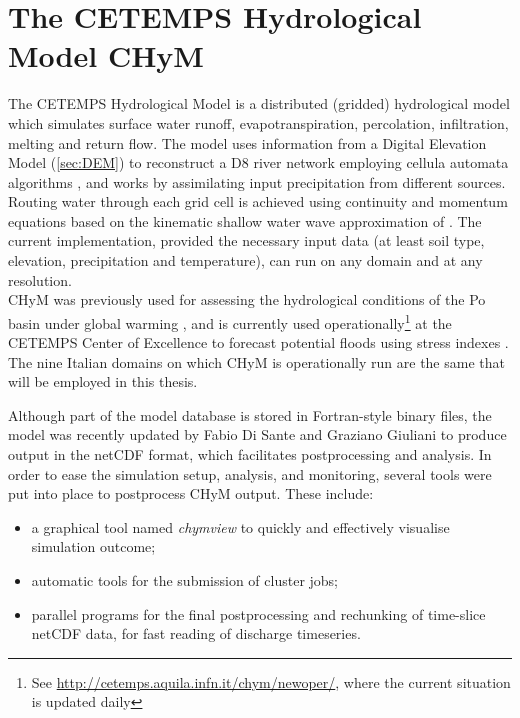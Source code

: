 
\section{The CETEMPS Hydrological Model CHyM} \label{sec:chym}
The CETEMPS Hydrological Model \citep[CHyM\footnote{\url{http://cetemps.aquila.infn.it/chym/}}, ][]{Tomassetti2005,Coppola2007} is a distributed (gridded) hydrological model which simulates surface water runoff,
evapotranspiration, percolation, infiltration, melting and return flow.
The model uses information from a Digital Elevation Model (\cref{sec:DEM}) to reconstruct a D8 river network employing cellula automata algorithms \citep{Coppola2006,Coppola2007}, and works by assimilating input precipitation from different sources.
Routing water through each grid cell is achieved using continuity
and momentum equations based on the kinematic shallow water wave approximation of \citet{Lighthill1955}.
The current implementation, provided the necessary input data (at least soil type, elevation, precipitation and temperature), can run on any domain and at any resolution.\\
CHyM was previously used for assessing the hydrological conditions of the Po basin under global warming \citep{coppola2014ChahydconPobasundglowar}, and
is currently used operationally\footnote{See \url{http://cetemps.aquila.infn.it/chym/newoper/}, where the current situation is updated daily} at the CETEMPS Center of Excellence to forecast potential floods using stress indexes \citep{Verdecchia2008,Tomassetti2005}.
The nine Italian domains on which CHyM is operationally run are the same that will be employed in this thesis.

Although part of the model database is stored in Fortran-style binary files, the model was recently updated by Fabio Di Sante and Graziano Giuliani to produce output in the netCDF format, which facilitates postprocessing and analysis.
In order to ease the simulation setup, analysis, and monitoring, several tools were put into place to postprocess CHyM output. These include:
\begin{itemize}
    \item a graphical tool named \emph{chymview} to quickly and effectively visualise simulation outcome;
    \item automatic tools for the submission of cluster jobs;
    \item parallel programs for the final postprocessing and rechunking of time-slice netCDF data, for fast reading of discharge timeseries.
\end{itemize}

